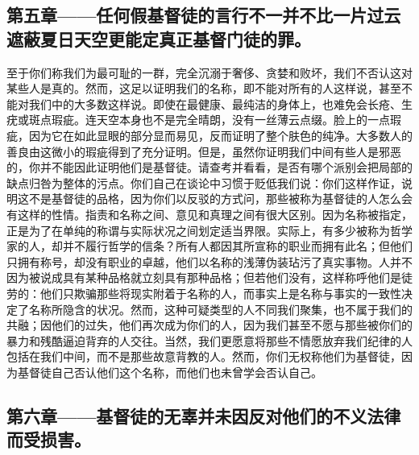 
\subsection{第五章——任何假基督徒的言行不一并不比一片过云遮蔽夏日天空更能定真正基督门徒的罪。}

至于你们称我们为最可耻的一群，完全沉溺于奢侈、贪婪和败坏，我们不否认这对某些人是真的。然而，这足以证明我们的名称，即不能对所有的人这样说，甚至不能对我们中的大多数这样说。即使在最健康、最纯洁的身体上，也难免会长疮、生疣或斑点瑕疵。连天空本身也不是完全晴朗，没有一丝薄云点缀。脸上的一点瑕疵，因为它在如此显眼的部分显而易见，反而证明了整个肤色的纯净。大多数人的善良由这微小的瑕疵得到了充分证明。但是，虽然你证明我们中间有些人是邪恶的，你并不能因此证明他们是基督徒。请查考并看看，是否有哪个派别会把局部的缺点归咎为整体的污点。你们自己在谈论中习惯于贬低我们说：你们这样作证，说明这不是基督徒的品格，因为你们以反驳的方式问，那些被称为基督徒的人怎么会有这样的性情。指责和名称之间、意见和真理之间有很大区别。因为名称被指定，正是为了在单纯的称谓与实际状况之间划定适当界限。实际上，有多少被称为哲学家的人，却并不履行哲学的信条？所有人都因其所宣称的职业而拥有此名；但他们只拥有称号，却没有职业的卓越，他们以名称的浅薄伪装玷污了真实事物。人并不因为被说成具有某种品格就立刻具有那种品格；但若他们没有，这样称呼他们是徒劳的：他们只欺骗那些将现实附着于名称的人，而事实上是名称与事实的一致性决定了名称所隐含的状况。然而，这种可疑类型的人不同我们聚集，也不属于我们的共融；因他们的过失，他们再次成为你们的人，因为我们甚至不愿与那些被你们的暴力和残酷逼迫背弃的人交往。当然，我们更愿意将那些不情愿放弃我们纪律的人包括在我们中间，而不是那些故意背教的人。然而，你们无权称他们为基督徒，因为基督徒自己否认他们这个名称，而他们也未曾学会否认自己。\par


\subsection{第六章——基督徒的无辜并未因反对他们的不义法律而受损害。}

